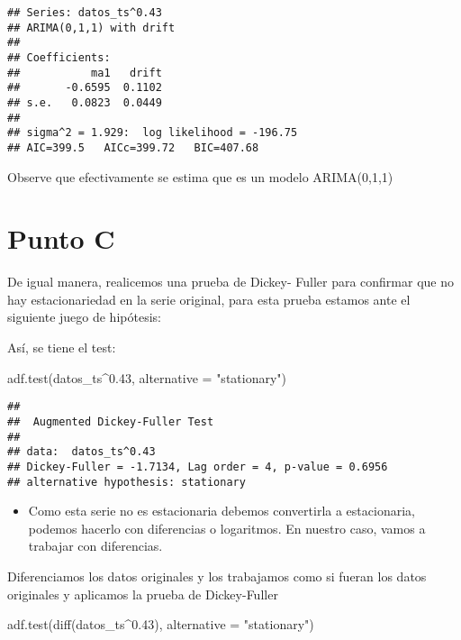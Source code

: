 \documentclass[
]{article}
\newenvironment{Shaded}{\begin{snugshade}}{\end{snugshade}}
\newcommand{\AttributeTok}[1]{\textcolor[rgb]{0.77,0.63,0.00}{#1}}
\newcommand{\FloatTok}[1]{\textcolor[rgb]{0.00,0.00,0.81}{#1}}
\newcommand{\FunctionTok}[1]{\textcolor[rgb]{0.00,0.00,0.00}{#1}}
\newcommand{\NormalTok}[1]{#1}
\newcommand{\SpecialCharTok}[1]{\textcolor[rgb]{0.00,0.00,0.00}{#1}}
\newcommand{\StringTok}[1]{\textcolor[rgb]{0.31,0.60,0.02}{#1}}
\providecommand{\tightlist}{%
  \setlength{\itemsep}{0pt}\setlength{\parskip}{0pt}}
\begin{document}
\begin{verbatim}
## Series: datos_ts^0.43 
## ARIMA(0,1,1) with drift 
## 
## Coefficients:
##           ma1   drift
##       -0.6595  0.1102
## s.e.   0.0823  0.0449
## 
## sigma^2 = 1.929:  log likelihood = -196.75
## AIC=399.5   AICc=399.72   BIC=407.68
\end{verbatim}

Observe que efectivamente se estima que es un modelo ARIMA(0,1,1)

\hypertarget{punto-c}{%
\section{Punto C}\label{punto-c}}

De igual manera, realicemos una prueba de Dickey- Fuller para confirmar
que no hay estacionariedad en la serie original, para esta prueba
estamos ante el siguiente juego de hipótesis:

Así, se tiene el test:

\begin{Shaded}
\begin{Highlighting}[]
\FunctionTok{adf.test}\NormalTok{(datos\_ts}\SpecialCharTok{\^{}}\FloatTok{0.43}\NormalTok{, }\AttributeTok{alternative =} \StringTok{"stationary"}\NormalTok{)}
\end{Highlighting}
\end{Shaded}

\begin{verbatim}
## 
##  Augmented Dickey-Fuller Test
## 
## data:  datos_ts^0.43
## Dickey-Fuller = -1.7134, Lag order = 4, p-value = 0.6956
## alternative hypothesis: stationary
\end{verbatim}

\begin{itemize}
\tightlist
\item
  Como esta serie no es estacionaria debemos convertirla a estacionaria,
  podemos hacerlo con diferencias o logaritmos. En nuestro caso, vamos a
  trabajar con diferencias.
\end{itemize}

Diferenciamos los datos originales y los trabajamos como si fueran los
datos originales y aplicamos la prueba de Dickey-Fuller

\begin{Shaded}
\begin{Highlighting}[]
\FunctionTok{adf.test}\NormalTok{(}\FunctionTok{diff}\NormalTok{(datos\_ts}\SpecialCharTok{\^{}}\FloatTok{0.43}\NormalTok{), }\AttributeTok{alternative =} \StringTok{"stationary"}\NormalTok{)}
\end{Highlighting}
\end{Shaded}
\end{document}
